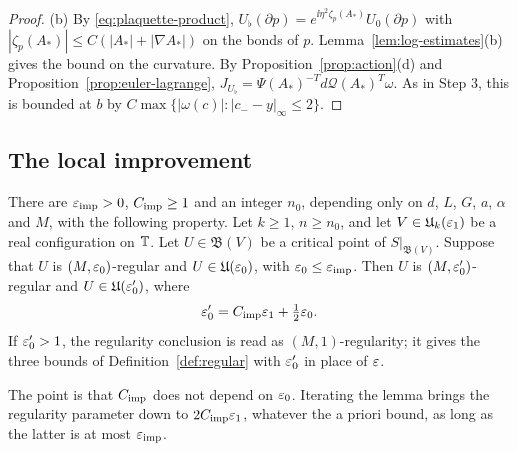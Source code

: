 \begin{proof}
(b) By \eqref{eq:plaquette-product}, $U_\flat(\partial p)=e^{\ii\eta^2\zeta_p(A_*)}U_0(\partial p)$ with $|\zeta_p(A_*)|\le C(|A_*|+|\nabla A_*|)$ on the bonds of $p$. Lemma~\ref{lem:log-estimates}(b) gives the bound on the curvature. By Proposition~\ref{prop:action}(d) and Proposition~\ref{prop:euler-lagrange}, $J_{U_\flat}=\Psi(A_*)^{-T}d\mathcal Q(A_*)^T\omega$. As in Step 3, this is bounded at $b$ by $C\max\{|\omega(c)|:|c_--y|_\infty\le2\}$.
\end{proof}

\subsection{The local improvement}\label{ss:29.2}

\begin{lemma}\label{lem:improvement}
There are $\varepsilon_{\rm imp}>0$, $C_{\rm imp}\ge1$ and an integer $n_0$, depending only on $d$, $L$, $G$, $a$, $\alpha$ and $M$, with the following property. Let $k\ge1$, $n\ge n_0$, and let $V\in\mathfrak U_k(\varepsilon_1)$ be a real configuration on $\mathbb T$. Let $U\in\mathfrak B(V)$ be a critical point of $S|_{\mathfrak B(V)}$. Suppose that $U$ is $(M,\varepsilon_0)$-regular and $U\in\mathfrak U(\varepsilon_0)$, with $\varepsilon_0\le\varepsilon_{\rm imp}$. Then $U$ is $(M,\varepsilon_0')$-regular and $U\in\mathfrak U(\varepsilon_0')$, where
\[
\varepsilon_0'=C_{\rm imp}\varepsilon_1+\tfrac12\varepsilon_0 .
\]
If $\varepsilon_0'>1$, the regularity conclusion is read as $(M,1)$-regularity; it gives the three bounds of Definition~\ref{def:regular} with $\varepsilon_0'$ in place of $\varepsilon$.
\end{lemma}

The point is that $C_{\rm imp}$ does not depend on $\varepsilon_0$. Iterating the lemma brings the regularity parameter down to $2C_{\rm imp}\varepsilon_1$, whatever the a priori bound, as long as the latter is at most $\varepsilon_{\rm imp}$.

